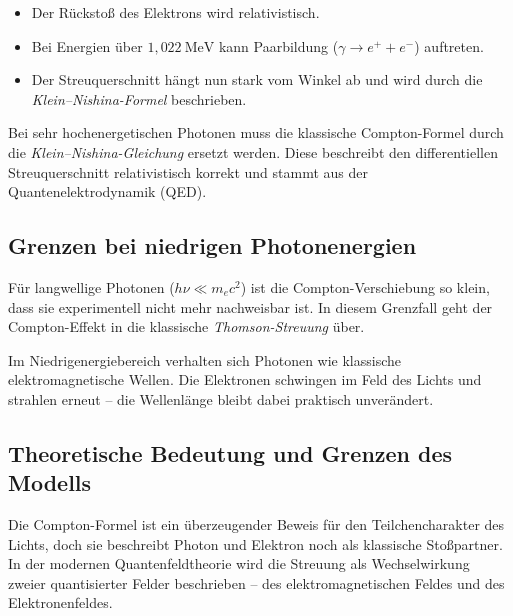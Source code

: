 \begin{itemize}
	\item Der Rückstoß des Elektrons wird relativistisch.
	\item Bei Energien über \(1{,}022~\text{MeV}\) kann Paarbildung (\(\gamma \to e^+ + e^-\)) auftreten.
	\item Der Streuquerschnitt hängt nun stark vom Winkel ab und wird durch die \emph{Klein–Nishina-Formel} beschrieben.
\end{itemize}

\begin{DidaktikBox}
	Bei sehr hochenergetischen Photonen muss die klassische Compton-Formel
	durch die \emph{Klein–Nishina-Gleichung} ersetzt werden.
	Diese beschreibt den differentiellen Streuquerschnitt relativistisch korrekt
	und stammt aus der Quantenelektrodynamik (QED).
\end{DidaktikBox}

\subsection{Grenzen bei niedrigen Photonenergien}

Für langwellige Photonen (\(h\nu \ll m_e c^2\)) ist die Compton-Verschiebung so klein,
dass sie experimentell nicht mehr nachweisbar ist. In diesem Grenzfall
geht der Compton-Effekt in die klassische \emph{Thomson-Streuung} über.

\begin{HinweisBox}
	Im Niedrigenergiebereich verhalten sich Photonen wie klassische elektromagnetische Wellen.
	Die Elektronen schwingen im Feld des Lichts und strahlen erneut –
	die Wellenlänge bleibt dabei praktisch unverändert.
\end{HinweisBox}

\subsection{Theoretische Bedeutung und Grenzen des Modells}

Die Compton-Formel ist ein überzeugender Beweis für den Teilchencharakter des Lichts,
doch sie beschreibt Photon und Elektron noch als klassische Stoßpartner.
In der modernen Quantenfeldtheorie wird die Streuung als Wechselwirkung
zweier quantisierter Felder beschrieben – des elektromagnetischen Feldes
und des Elektronenfeldes.

